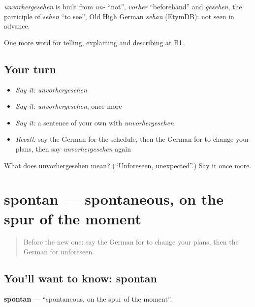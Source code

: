 \begin{cousinweb}
\emph{unvorhergesehen} is built from \emph{un-} \textquotedblleft{}not\textquotedblright{}, \emph{vorher} \textquotedblleft{}beforehand\textquotedblright{} and \emph{gesehen}, the participle of \emph{sehen} \textquotedblleft{}to see\textquotedblright{}, Old High German \emph{sehan} (EtymDB): not seen in advance.
\end{cousinweb}

\begin{grammarlens}[title={What you've built}]
One more word for telling, explaining and describing at B1.
\end{grammarlens}

\subsection*{Your turn}
\begin{itemize}
\raggedright
  \item \emph{Say it:} \emph{unvorhergesehen}
  \item \emph{Say it:} \emph{unvorhergesehen}, once more
  \item \emph{Say it:} a sentence of your own with \emph{unvorhergesehen}
  \item \emph{Recall:} say the German for the schedule, then the German for to change your plans, then say \emph{unvorhergesehen} again
\end{itemize}

\begin{tcolorbox}[breakable,colback=teal!4,colframe=teal!35!black,title={Before you move on}]
What does unvorhergesehen mean? (\textquotedblleft{}Unforeseen, unexpected\textquotedblright{}.) Say it once more.
\end{tcolorbox}
\section[spontan]{spontan — spontaneous, on the spur of the moment}

\label{lesson:GE-C373-spontan}



\begin{quote}
Before the new one: say the German for to change your plans, then the German for unforeseen.
\end{quote}

\subsection*{You'll want to know: spontan}
\textbf{spontan} — \textquotedblleft{}spontaneous, on the spur of the moment\textquotedblright{}.

